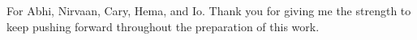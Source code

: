 \documentclass[letterpaper,12pt]{report}	%
\begin{document}
\copyrightpage  %

\commcertpage   %

\titlepage      %


\begin{dedication}		%
For Abhi, Nirvaan, Cary, Hema, and Io. Thank you for giving me the strength to keep pushing forward throughout the preparation of this work.  
\end{dedication}


\begin{acknowledgments}	

  

\end{acknowledgments}


%

\utabstract

\end{document}
